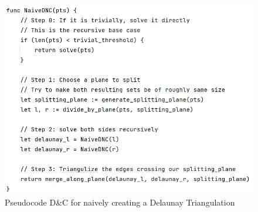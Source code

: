 \begin{figure}[H]
    \centering
    \includegraphics[width=\textwidth]{pseudocode_dnc_naive.PNG}
    \caption{Pseudocode D\&C for naively creating a Delaunay Triangulation}
    \label{fig:my_label}
\end{figure}
